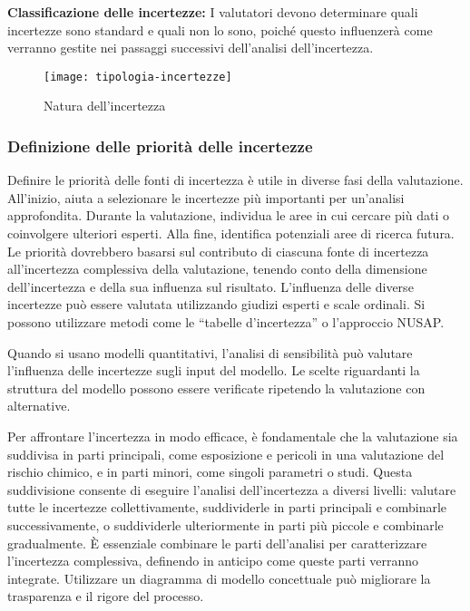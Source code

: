 \textbf{Classificazione delle incertezze:} I valutatori devono determinare quali incertezze sono standard e quali non lo sono, poiché questo influenzerà come verranno gestite nei passaggi successivi dell'analisi dell'incertezza.

\begin{figure}[!ht] 
    \centering 
    \texttt{[image: tipologia-incertezze]} 
    \caption{Natura dell'incertezza}
\end{figure}

\subsubsection{Definizione delle priorità delle incertezze}

Definire le priorità delle fonti di incertezza è utile in diverse fasi della valutazione. All'inizio, aiuta a selezionare le incertezze più importanti per un'analisi approfondita. Durante la valutazione, individua le aree in cui cercare più dati o coinvolgere ulteriori esperti. Alla fine, identifica potenziali aree di ricerca futura. Le priorità dovrebbero basarsi sul contributo di ciascuna fonte di incertezza all'incertezza complessiva della valutazione, tenendo conto della dimensione dell'incertezza e della sua influenza sul risultato.
L'influenza delle diverse incertezze può essere valutata utilizzando giudizi esperti e scale ordinali. Si possono utilizzare metodi come le “tabelle d'incertezza” o l'approccio NUSAP.

Quando si usano modelli quantitativi, l'analisi di sensibilità può valutare l'influenza delle incertezze sugli input del modello. Le scelte riguardanti la struttura del modello possono essere verificate ripetendo la valutazione con alternative.

Per affrontare l'incertezza in modo efficace, è fondamentale che la valutazione sia suddivisa in parti principali, come esposizione e pericoli in una valutazione del rischio chimico, e in parti minori, come singoli parametri o studi. Questa suddivisione consente di eseguire l'analisi dell'incertezza a diversi livelli: valutare tutte le incertezze collettivamente, suddividerle in parti principali e combinarle successivamente, o suddividerle ulteriormente in parti più piccole e combinarle gradualmente. È essenziale combinare le parti dell'analisi per caratterizzare l'incertezza complessiva, definendo in anticipo come queste parti verranno integrate. Utilizzare un diagramma di modello concettuale può migliorare la trasparenza e il rigore del processo.\\

